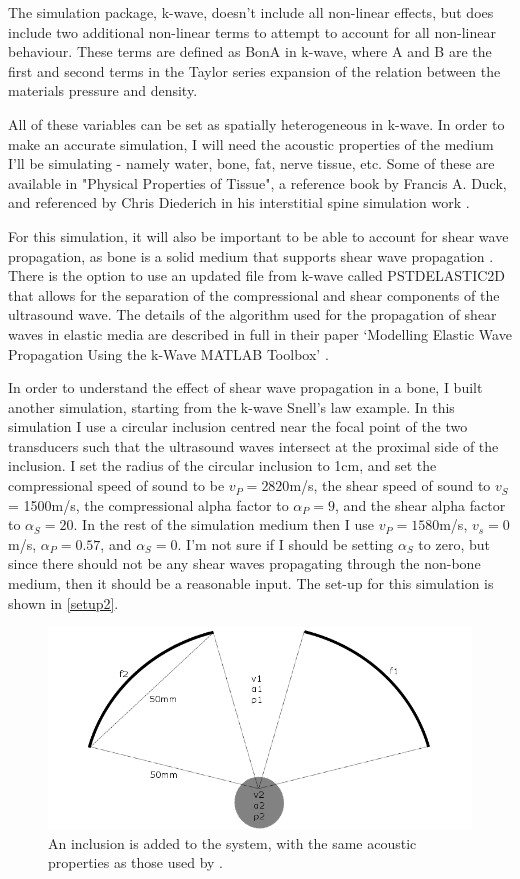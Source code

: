 \documentclass[10pt,a4paper]{article}
\begin{document}
The simulation package, k-wave, doesn't include all non-linear effects, but does include two additional non-linear terms to attempt to account for all non-linear behaviour. These terms are defined as BonA in k-wave, where A and B are the first and second terms in the Taylor series expansion of the relation between the materials pressure and density.

All of these variables can be set as spatially heterogeneous in k-wave. In order to make an accurate simulation, I will need the acoustic properties of the medium I'll be simulating - namely water, bone, fat, nerve tissue, etc. Some of these are available in "Physical Properties of Tissue", a reference book by Francis A. Duck, and referenced by Chris Diederich in his interstitial spine simulation work \cite{duck1990physical}.

For this simulation, it will also be important to be able to account for shear wave propagation, as bone is a solid medium that supports shear wave propagation \cite{treeby2015contribution}. There is the option to use an updated file from k-wave called PSTDELASTIC2D that allows for the separation of the compressional and shear components of the ultrasound wave. The details of the algorithm used for the propagation of shear waves in elastic media are described in full in their paper `Modelling Elastic Wave Propagation Using the k-Wave MATLAB Toolbox' \cite{treeby2014modelling}.

In order to understand the effect of shear wave propagation in a bone, I built another simulation, starting from the k-wave Snell's law example. In this simulation I use a circular inclusion centred near the focal point of the two transducers such that the ultrasound waves intersect at the proximal side of the inclusion. I set the radius of the circular inclusion to 1cm, and set the compressional speed of sound to be $v_P = 2820$m/s, the shear speed of sound to $v_S$ = 1500m/s, the compressional alpha factor to $\alpha_P = 9$, and the shear alpha factor to $\alpha_S = 20$. In the rest of the simulation medium then I use $v_P = 1580$m/s, $v_s = 0$m/s, $\alpha_P = 0.57$, and $\alpha_S = 0$. I'm not sure if I should be setting $\alpha_S$ to zero, but since there should not be any shear waves propagating through the non-bone medium, then it should be a reasonable input. The set-up for this simulation is shown in \autoref{setup2}.
\begin{figure}[H] 
\centering
\includegraphics[scale=0.5]{setup2}
\caption{An inclusion is added to the system, with the same acoustic properties as those used by \cite{treeby2015contribution}.}\label{setup2}
\end{figure}
\end{document}
